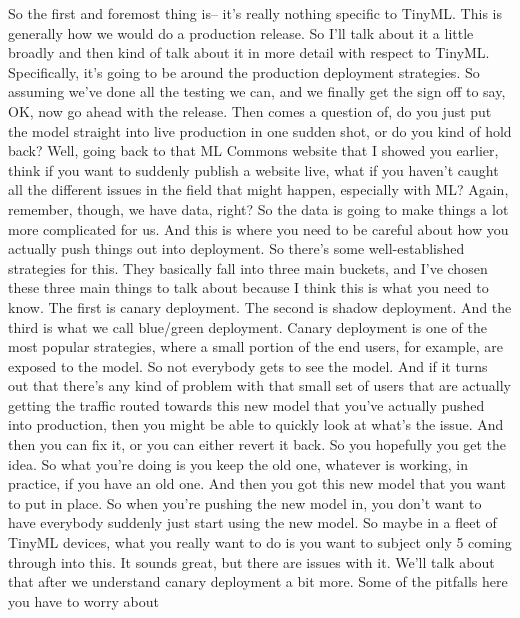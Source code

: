{{{{    So the first and foremost thing is--
    it's really nothing specific to TinyML.
    This is generally how we would do a production release.
    So I'll talk about it a little broadly and then kind of talk about it
    in more detail with respect to TinyML.
    Specifically, it's going to be around the production deployment strategies.
    So assuming we've done all the testing we can,
    and we finally get the sign off to say, OK, now go ahead with the release.
    Then comes a question of, do you just put the model
    straight into live production in one sudden shot,
    or do you kind of hold back?
    Well, going back to that ML Commons website that I showed you earlier,
    think if you want to suddenly publish a website live,
    what if you haven't caught all the different issues in the field that
    might happen, especially with ML?
    Again, remember, though, we have data, right?
    So the data is going to make things a lot more complicated for us.
    And this is where you need to be careful about how you actually push things out
    into deployment.
    So there's some well-established strategies for this.
    They basically fall into three main buckets,
    and I've chosen these three main things to talk about because I
    think this is what you need to know.
    The first is canary deployment.
    The second is shadow deployment.
    And the third is what we call blue/green deployment.
    Canary deployment is one of the most popular strategies,
    where a small portion of the end users, for example, are exposed to the model.
    So not everybody gets to see the model.
    And if it turns out that there's any kind of problem
    with that small set of users that are actually getting the traffic routed
    towards this new model that you've actually pushed into production,
    then you might be able to quickly look at what's the issue.
    And then you can fix it, or you can either revert it back.
    So you hopefully you get the idea.
    So what you're doing is you keep the old one, whatever is working,
    in practice, if you have an old one.
    And then you got this new model that you want to put in place.
    So when you're pushing the new model in, you
    don't want to have everybody suddenly just start using the new model.
    So maybe in a fleet of TinyML devices, what you really want to do
    is you want to subject only 5%
    coming through into this.
    It sounds great, but there are issues with it.
    We'll talk about that after we understand
    canary deployment a bit more.
    Some of the pitfalls here you have to worry about
}}}}

